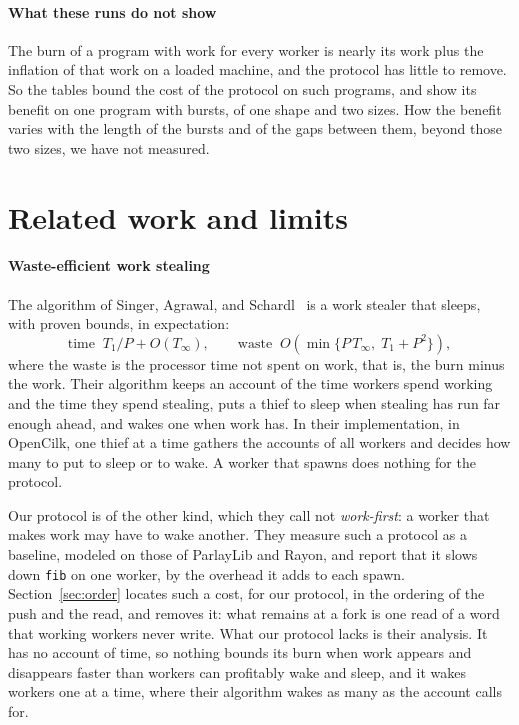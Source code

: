 \documentclass[sigplan,nonacm]{acmart}
\begin{document}
\paragraph{What these runs do not show}
%
The burn of a program with work for every worker is nearly its work
plus the inflation of that work on a loaded machine, and the protocol
has little to remove.
%
So the tables bound the cost of the protocol on such programs, and
show its benefit on one program with bursts, of one shape and two
sizes.
%
How the benefit varies with the length of the bursts and of the gaps
between them, beyond those two sizes, we have not measured.

\section{Related work and limits}
\label{sec:related}

\paragraph{Waste-efficient work stealing}
%
The algorithm of Singer, Agrawal, and
Schardl~\cite{singer2026wews} is a work stealer that sleeps, with
proven bounds, in expectation:
\[
\text{time}\;\; T_1/P + O(T_\infty), \qquad
\text{waste}\;\; O(\min\{P\,T_\infty,\; T_1 + P^2\}),
\]
where the waste is the processor time not spent on work, that is, the
burn minus the work.
%
Their algorithm keeps an account of the time workers spend working and
the time they spend stealing, puts a thief to sleep when stealing has
run far enough ahead, and wakes one when work has.
%
In their implementation, in OpenCilk, one thief at a time gathers the
accounts of all workers and decides how many to put to sleep or to
wake.
%
A worker that spawns does nothing for the protocol.

Our protocol is of the other kind, which they call not
\emph{work-first}: a worker that makes work may have to wake another.
%
They measure such a protocol as a baseline, modeled on those of
ParlayLib and Rayon, and report that it slows down \lstinline|fib|
on one worker, by the overhead it adds to each spawn.
%
Section~\ref{sec:order} locates such a cost, for our protocol, in the
ordering of the push and the read, and removes it: what remains at a
fork is one read of a word that working workers never write.
%
What our protocol lacks is their analysis.
%
It has no account of time, so nothing bounds its burn when work
appears and disappears faster than workers can profitably wake and
sleep, and it wakes workers one at a time, where their algorithm
wakes as many as the account calls for.
\end{document}
